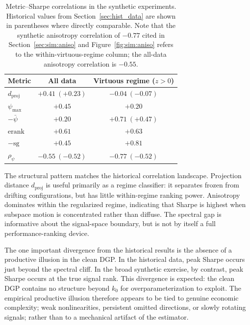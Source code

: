 \documentclass[11pt,letterpaper]{article}
\newcommand{\dproj}{d_{\mathrm{proj}}}
\newcommand{\erank}{\mathrm{erank}}
\begin{document}
\begin{table}[H]
\centering
\caption{Metric--Sharpe correlations in the synthetic experiments.
Historical values from Section~\ref{sec:hist_data} are shown in parentheses
where directly comparable. Note that the synthetic anisotropy correlation
of $-0.77$ cited in Section~\ref{sec:sim:aniso} and Figure~\ref{fig:sim:aniso}
refers to the within-virtuous-regime column; the all-data anisotropy
correlation is $-0.55$.}
\label{tab:sim:corr}
\smallskip
\begin{tabular}{lcc}
\toprule
Metric & All data & Virtuous regime ($z>0$) \\
\midrule
$\dproj$           & $+0.41\ (+0.23)$  & $-0.04\ (-0.07)$ \\
$\psi_{\max}$    & $+0.45$           & $+0.20$          \\
$-\bar\psi$      & $+0.20$           & $+0.71\ (+0.47)$ \\
$\erank$           & $+0.61$           & $+0.63$          \\
$-\mathrm{sg}$     & $+0.45$           & $+0.81$          \\
$\rho_\psi$      & $-0.55\ (-0.52)$  & $-0.77\ (-0.52)$ \\
\bottomrule
\end{tabular}
\end{table}

The structural pattern matches the historical correlation landscape. Projection distance $\dproj$ is useful primarily as a regime classifier: it separates frozen from drifting configurations, but has little within-regime ranking power. Anisotropy dominates within the regularized regime, indicating that Sharpe is highest when subspace motion is concentrated rather than diffuse. The spectral gap is informative about the signal-space boundary, but is not by itself a full performance-ranking device.

The one important divergence from the historical results is the absence of a productive illusion in the clean DGP. In the historical data, peak Sharpe occurs just beyond the spectral cliff. In the broad synthetic exercise, by contrast, peak Sharpe occurs at the true signal rank. This divergence is expected: the clean DGP contains no structure beyond $k_0$ for overparameterization to exploit. The empirical productive illusion therefore appears to be tied to genuine economic complexity; weak nonlinearities, persistent omitted directions, or slowly rotating signals; rather than to a mechanical artifact of the estimator.
\end{document}
